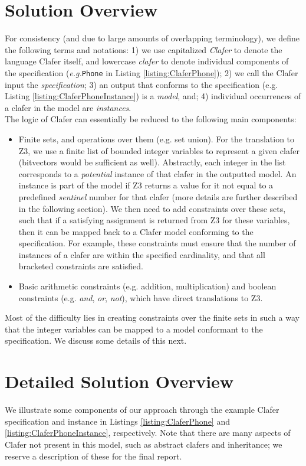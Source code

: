 \documentclass{article}
\newcommand{\eg}{\emph{e.g.}\xspace}
\begin{document}
\section{Solution Overview}
For consistency (and due to large amounts of overlapping terminology), we define the following terms and notations: 1) we use capitalized \textit{Clafer} to denote the language Clafer itself, and lowercase \textit{clafer} to denote individual components of the specification (\eg \texttt{Phone} in Listing \ref{listing:ClaferPhone}); 2) we call the Clafer input the \textit{specification}; 3) an output that conforms to the specification (e.g. Listing \ref{listing:ClaferPhoneInstance}) is a \textit{model}, and; 4) individual occurrences of a clafer in the model are \textit{instances}. \\
\indent The logic of Clafer can essentially be reduced to the following main components:
\begin{itemize}
\item Finite sets, and operations over them (e.g. set union). For the translation to Z3, we use a finite list of bounded integer variables to represent a given clafer (bitvectors would be sufficient as well). Abstractly, each integer in the list corresponds to a \textit{potential} instance of that clafer in the outputted model. An instance is part of the model if Z3 returns a value for it not equal to a predefined \textit{sentinel} number for that clafer (more details are further described in the following section). We then need to add constraints over these sets, such that if a satisfying assignment is returned from Z3 for these variables, then it can be mapped back to a Clafer model conforming to the specification. For example, these constraints must ensure that the number of instances of a clafer are within the specified cardinality, and that all bracketed constraints are satisfied.
\item Basic arithmetic constraints (e.g. addition, multiplication) and boolean constraints (e.g. \textit{and}, \textit{or}, \textit{not}), which have direct translations to Z3.
\end{itemize} 

Most of the difficulty lies in creating constraints over the finite sets in such a way that the integer variables can be mapped to a model conformant to the specification. We discuss some details of this next.

\section{Detailed Solution Overview}
We illustrate some components of our approach through the example Clafer specification and instance in Listings \ref{listing:ClaferPhone} and \ref{listing:ClaferPhoneInstance}, respectively. Note that there are many aspects of Clafer not present in this model, such as abstract clafers and inheritance; we reserve a description of these for the final report.
\end{document}

